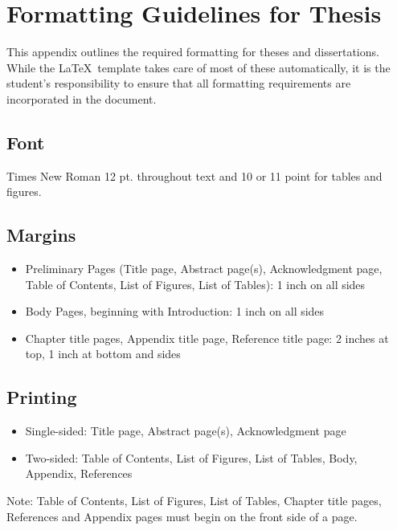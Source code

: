 \chapter{Formatting Guidelines for Thesis}
\label{apdx:appendixb}

This appendix outlines the required formatting for theses and dissertations. While the \LaTeX\ template takes care of most of these automatically, it is the student's responsibility to ensure that all formatting requirements are incorporated in the document.

\section{Font} Times New Roman 12 pt. throughout text and 10 or 11 point for tables and figures.

\section{Margins}
\begin{itemize}
\item Preliminary Pages (Title page, Abstract page(s), Acknowledgment page, Table of Contents, List of Figures, List of Tables):
1 inch on all sides
\item Body Pages, beginning with Introduction:
1 inch on all sides
\item Chapter title pages, Appendix title page, Reference title page:
2 inches at top,
1 inch at bottom and sides
\end{itemize}

\section{Printing}
\begin{itemize}
\item Single-sided: Title page, Abstract page(s), Acknowledgment page
\item Two-sided:  Table of Contents, List of Figures, List of Tables, Body, Appendix, References
\end{itemize}
Note:  Table of Contents, List of Figures, List of Tables, Chapter title pages, References and Appendix pages must begin on the front side of a page.

